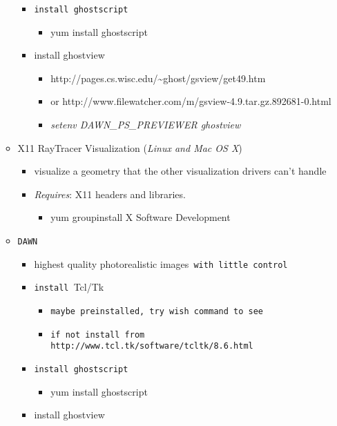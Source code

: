 \documentclass{article}
\begin{document}
\begin{itemize}
\begin{itemize}
\begin{itemize}
\item \texttt{install ghostscript}

\begin{itemize}
\item yum install ghostscript
\end{itemize}
\item install ghostview

\begin{itemize}
\item http://pages.cs.wisc.edu/\~{}ghost/gsview/get49.htm
\item or http://www.filewatcher.com/m/gsview-4.9.tar.gz.892681-0.html
\item \emph{setenv DAWN\_PS\_PREVIEWER {\textquotedbl}ghostview{\textquotedbl}}
\end{itemize}
\end{itemize}
\item X11 RayTracer Visualization (\emph{Linux and Mac OS X}) 

\begin{itemize}
\item visualize a geometry that the other visualization drivers can't handle
\item \emph{Requires}: X11 headers and libraries. 

\begin{itemize}
\item yum groupinstall {\textquotedbl}X Software Development{\textquotedbl}
\end{itemize}
\end{itemize}
\item \texttt{DAWN}

\begin{itemize}
\item highest quality photorealistic images\texttt{ with little control}
\item \texttt{install }Tcl/Tk 

\begin{itemize}
\item \texttt{maybe preinstalled, try wish command to see}
\item \texttt{if not install from http://www.tcl.tk/software/tcltk/8.6.html}
\end{itemize}
\item \texttt{install ghostscript}

\begin{itemize}
\item yum install ghostscript
\end{itemize}
\item install ghostview


\end{itemize}
\end{itemize}
\end{itemize}
\end{document}
